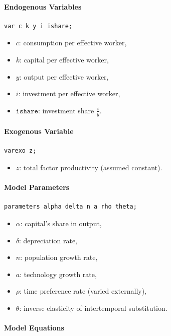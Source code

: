 \documentclass[12pt,a4paper,notitlepage]{article}
\numberwithin{equation}{section}
\begin{document}
\begin{itemize}
\paragraph{Endogenous Variables}
\begin{lstlisting}
var c k y i ishare;
\end{lstlisting}

\begin{itemize}
  \item \( c \): consumption per effective worker,
  \item \( k \): capital per effective worker,
  \item \( y \): output per effective worker,
  \item \( i \): investment per effective worker,
  \item \( \texttt{ishare} \): investment share \( \frac{i}{y} \).
\end{itemize}

\paragraph{Exogenous Variable}
\begin{lstlisting}
varexo z;
\end{lstlisting}
\begin{itemize}
  \item \( z \): total factor productivity (assumed constant).
\end{itemize}

\paragraph{Model Parameters}
\begin{lstlisting}
parameters alpha delta n a rho theta;
\end{lstlisting}
\begin{itemize}
  \item \( \alpha \): capital's share in output,
  \item \( \delta \): depreciation rate,
  \item \( n \): population growth rate,
  \item \( a \): technology growth rate,
  \item \( \rho \): time preference rate (varied externally),
  \item \( \theta \): inverse elasticity of intertemporal substitution.
\end{itemize}

\paragraph{Model Equations}


\end{itemize}
\end{document}
